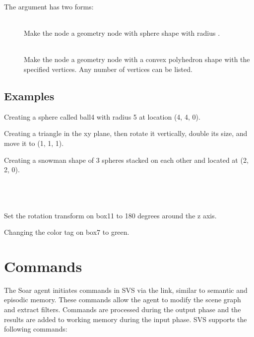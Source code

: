 The  argument has two forms:

\begin{description}
	\item[] \hfill \\
		Make the node a geometry node with sphere shape with radius .
	\item[] \hfill \\
		Make the node a geometry node with a convex polyhedron shape with the specified vertices.
		Any number of vertices can be listed.
\end{description}


\subsection{Examples}

Creating a sphere called ball4 with radius 5 at location (4, 4, 0). \\

Creating a triangle in the xy plane, then rotate it vertically, double its size, and move it to (1, 1, 1).  \\

Creating a snowman shape of 3 spheres stacked on each other and located at (2, 2, 0). \\
 \\
 \\
 \\

Set the rotation transform on box11 to 180 degrees around the z axis. \\

Changing the color tag on box7 to green. \\


\section{Commands}

The Soar agent initiates commands in SVS via the  link,
similar to semantic and episodic memory. These commands allow the agent to
modify the scene graph and extract filters.
Commands are processed during the output phase and the results are added to
working memory during the input phase.
SVS supports the following commands:

